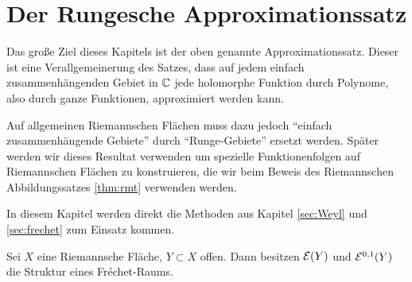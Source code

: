 
\section{Der Rungesche Approximationssatz}
\label{sec:Runge}

Das große Ziel dieses Kapitels ist der oben genannte
Approximationssatz. Dieser ist eine Verallgemeinerung des Satzes, dass
auf jedem einfach zusammenhängenden Gebiet in $\mathbb{C}$ jede holomorphe
Funktion durch Polynome, also durch ganze Funktionen, approximiert
werden kann.

Auf allgemeinen Riemannschen Flächen muss dazu jedoch "`einfach
zusammenhängende Gebiete"' durch "`Runge-Gebiete"' ersetzt
werden. Später werden wir dieses Resultat verwenden um spezielle
Funktionenfolgen auf Riemannschen Flächen zu konstruieren, die wir
beim Beweis des Riemannschen Abbildungssatzes \ref{thm:rmt} verwenden
werden.

In diesem Kapitel werden direkt die Methoden aus Kapitel
\ref{sec:Weyl} und \ref{sec:frechet} zum Einsatz kommen.

\begin{prop}
  \label{prop:diff-frechet}
  Sei $X$ eine Riemannsche Fläche, $Y \subset X$ offen. 
  Dann besitzen $\mathcal{E}(Y)$ und $\mathcal{E}^{0,1}(Y)$ die Struktur eines Fr\'echet-Raums.
\end{prop}


